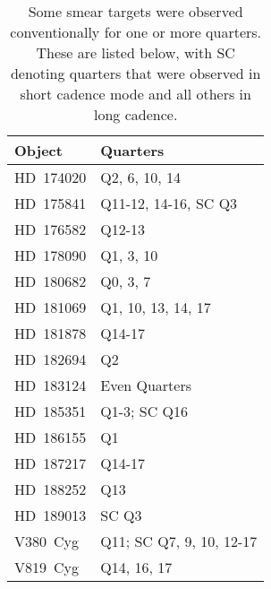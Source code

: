\begin{table}
\caption{Some smear targets were observed conventionally for one or more quarters. 
These are listed below, with SC denoting quarters that were observed in short cadence mode and all others in long cadence.\label{quarters}}
\begin{tabular}{ll}
\hline \hline
Object & Quarters \\
\hline
HD~174020 & Q2, 6, 10, 14            \\
HD~175841 & Q11-12, 14-16, SC Q3     \\
HD~176582 & Q12-13                   \\
HD~178090 & Q1, 3, 10                \\
HD~180682 & Q0, 3, 7                 \\
HD~181069 & Q1, 10, 13, 14, 17       \\
HD~181878 & Q14-17                   \\
HD~182694 & Q2                       \\
HD~183124 & Even Quarters            \\
HD~185351 & Q1-3; SC Q16             \\
HD~186155 & Q1                       \\
HD~187217 & Q14-17                   \\
HD~188252 & Q13                      \\
HD~189013 & SC Q3                    \\
V380~Cyg  & Q11; SC Q7, 9, 10, 12-17 \\
V819~Cyg  & Q14, 16, 17    \\
\hline         
\end{tabular}
\end{table}